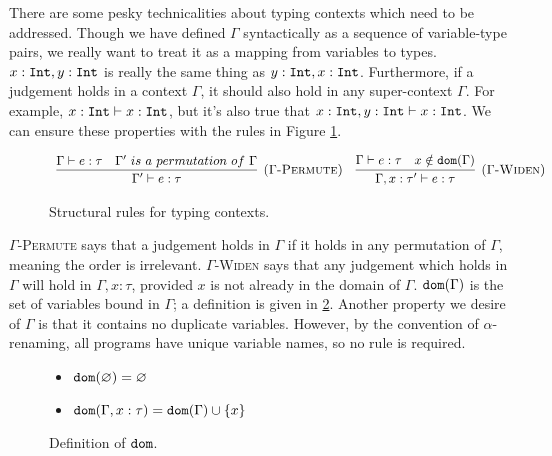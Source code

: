 There are some pesky technicalities about typing contexts which need to be addressed. Though we have defined $\Gamma$ syntactically as a sequence of variable-type pairs, we really want to treat it as a mapping from variables to types. $x: \mathtt{Int}, y: \mathtt{Int}$ is really the same thing as $y: \mathtt{Int}, x: \mathtt{Int}$. Furthermore, if a judgement holds in a context $\Gamma$, it should also hold in any super-context $\Gamma$. For example, $x:\mathtt{Int} \vdash x:\mathtt{Int}$, but it's also true that $x:\mathtt{Int}, y:\mathtt{Int} \vdash x:\mathtt{Int}$. We can ensure these properties with the rules in Figure \ref{fig:ctx_rules}.

\begin{figure}[h]

\noindent
{}

\[
\begin{array}{c}

\infer[\textsc{($\Gamma$-Permute)}]
	{\Gamma' \vdash e: \tau}
	{\Gamma \vdash e: \tau & \Gamma'~is~a~permutation~of~\Gamma}
	~~~
\infer[\textsc{($\Gamma$-Widen)}]
	{\Gamma, x: \tau' \vdash e: \tau }
	{\Gamma \vdash e: \tau & x \notin \kwa{dom}(\Gamma)}

	
\end{array}
\]

\vspace{-12pt}
\caption{Structural rules for typing contexts.}
\label{fig:ctx_rules}
\end{figure}

\textsc{$\Gamma$-Permute} says that a judgement holds in $\Gamma$ if it holds in any permutation of $\Gamma$, meaning the order is irrelevant. \textsc{$\Gamma$-Widen} says that any judgement which holds in $\Gamma$ will hold in $\Gamma, x: \tau$, provided $x$ is not already in the domain of $\Gamma$. $\mathtt{dom}(\Gamma)$ is the set of variables bound in $\Gamma$; a definition is given in \ref{fig:ctx_dom_defn}. Another property we desire of $\Gamma$ is that it contains no duplicate variables. However, by the convention of $\alpha$-renaming, all programs have unique variable names, so no rule is required.

\begin{figure}[h]


\begin{itemize}
	\setlength\itemsep{-0.7em}
	\item[] $\mathtt{dom}(\varnothing) = \varnothing$
	\item[] $\mathtt{dom}(\Gamma, x: \tau) = \mathtt{dom}(\Gamma) \cup \{ x \}$
\end{itemize}

\vspace{-12pt}
\caption{Definition of $\mathtt{dom}$.}
\label{fig:ctx_dom_defn}
\end{figure}


